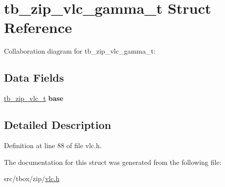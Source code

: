 \hypertarget{structtb__zip__vlc__gamma__t}{\section{tb\-\_\-zip\-\_\-vlc\-\_\-gamma\-\_\-t Struct Reference}
\label{structtb__zip__vlc__gamma__t}
}


Collaboration diagram for tb\-\_\-zip\-\_\-vlc\-\_\-gamma\-\_\-t\-:
\subsection*{Data Fields}
\begin{DoxyCompactItemize}
\item 
\hypertarget{structtb__zip__vlc__gamma__t_a69303a52774af7b53fb1c9e94b82f978}{\hyperlink{structtb__zip__vlc__t}{tb\-\_\-zip\-\_\-vlc\-\_\-t} {\bfseries base}}\label{structtb__zip__vlc__gamma__t_a69303a52774af7b53fb1c9e94b82f978}

\end{DoxyCompactItemize}


\subsection{Detailed Description}


Definition at line 88 of file vlc.\-h.



The documentation for this struct was generated from the following file\-:\begin{DoxyCompactItemize}
\item 
src/tbox/zip/\hyperlink{vlc_8h}{vlc.\-h}\end{DoxyCompactItemize}
